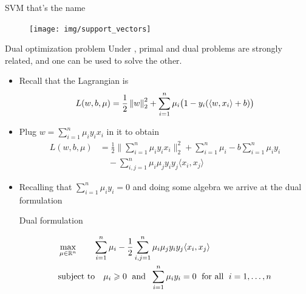\documentclass[xcolor={usenames,dvipsnames}]{beamer}
\begin{document}
\begin{frame}{SVM that's the name}
\begin{figure}
\begin{center}
\texttt{[image: img/support\_vectors]}
\end{center}
\end{figure}

\end{frame}



  \begin{frame}[allowframebreaks]{Dual optimization problem}
Under , primal and dual problems are strongly related, and one can be used to solve the other.


\begin{itemize}
\item  Recall that the Lagrangian is
  \begin{equation*}
    L(w, b, \mu) = \frac 12 \left\| w \right\|_2^2 + \sum_{i=1}^n \mu_i \big(1 - y_i( \langle {w, x_i} \rangle  + b) \big)
  \end{equation*}  
\item   Plug $w = \sum_{i=1}^n \mu_i y_i x_i$ in it to obtain
  \begin{align*}
    L(w, b, \mu) &= \frac 12 \Big\| \sum_{i=1}^n \mu_i y_i x_i \Big\|_2^2 
    + \sum_{i=1}^n \mu_i - b \sum_{i=1}^n \mu_i y_i \\
       &\quad - \sum_{i, j=1}^n \mu_i \mu_j y_i y_j \langle {x_i, x_j} \rangle 
  \end{align*}
 \item  Recalling that $\sum_{i=1}^n \mu_i y_i = 0$ and doing some algebra we arrive at the dual formulation

\begin{block}{Dual formulation}

  \begin{align*}
      &\max_{\mu \in \mathbb{R}^n} \quad \quad \sum_{i=1}^n \mu_i - \frac 12 \sum_{i, j=1}^n \mu_i \mu_j y_i y_j \langle {x_i, x_j} \rangle  \\
    &\text{subject to} \quad \mu_i \geqslant 0 \; \text{ and } \; 
    \sum_{i=1}^n \mu_i y_i  = 0 \; \text{ for all } \; i=1, \ldots, n
  \end{align*}
  \end{block}
  \end{itemize}

\end{frame}
\end{document}
